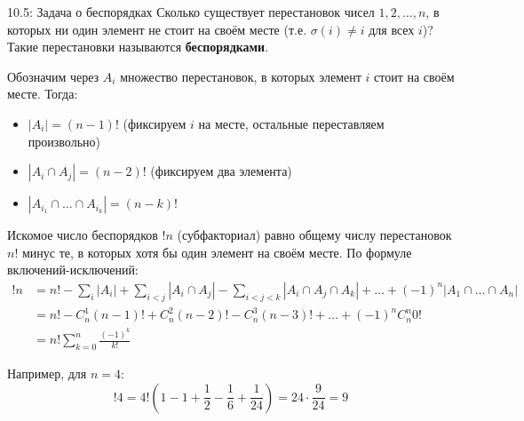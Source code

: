 \documentclass[a4paper,12pt]{article}
\begin{document}
	\begin{examplebox}{10.5: Задача о беспорядках}
		Сколько существует перестановок чисел $1, 2, \dots, n$, в которых ни один элемент не стоит на своём месте (т.е. $\sigma(i) \neq i$ для всех $i$)? Такие перестановки называются \textbf{беспорядками}.
		
		Обозначим через $A_i$ множество перестановок, в которых элемент $i$ стоит на своём месте. Тогда:
		\begin{itemize}
			\item $|A_i| = (n-1)!$ (фиксируем $i$ на месте, остальные переставляем произвольно)
			\item $|A_i \cap A_j| = (n-2)!$ (фиксируем два элемента)
			\item $|A_{i_1} \cap \dots \cap A_{i_k}| = (n-k)!$
		\end{itemize}
		
		Искомое число беспорядков $!n$ (субфакториал) равно общему числу перестановок $n!$ минус те, в которых хотя бы один элемент на своём месте. По формуле включений-исключений:
		\begin{align*}
			!n &= n! - \sum_i |A_i| + \sum_{i<j} |A_i \cap A_j| - \sum_{i<j<k} |A_i \cap A_j \cap A_k| + \dots + (-1)^n |A_1 \cap \dots \cap A_n| \\
			&= n! - C_n^1 (n-1)! + C_n^2 (n-2)! - C_n^3 (n-3)! + \dots + (-1)^n C_n^n 0! \\
			&= n! \sum_{k=0}^n \frac{(-1)^k}{k!}
		\end{align*}
		
		Например, для $n=4$:
		\[ !4 = 4! \left(1 - 1 + \frac{1}{2} - \frac{1}{6} + \frac{1}{24}\right) = 24 \cdot \frac{9}{24} = 9 \]
	\end{examplebox}
	
	\begin{center}
	\end{center}
	
\end{document}
